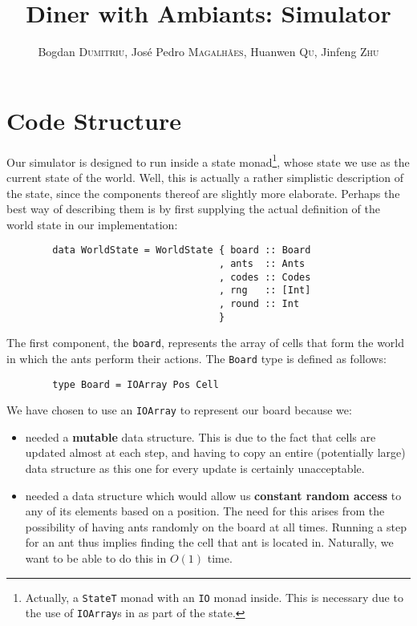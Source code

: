 \documentclass[a4paper,10pt]{article}
\title{Diner with Ambiants: Simulator}
\author{Bogdan \textsc{Dumitriu}, Jos\'e Pedro \textsc{Magalh\~aes}, Huanwen \textsc{Qu}, Jinfeng \textsc{Zhu}}
\begin{document}
\maketitle

\section{Code Structure}

Our simulator is designed to run inside a state monad\footnote[1]{Actually, a
{\tt StateT} monad with an {\tt IO} monad inside. This is necessary due to the
use of {\tt IOArray}s in as part of the state.}, whose state we use
as the current state of the world. Well, this is actually a rather simplistic
description of the state, since the components thereof are slightly more elaborate.
Perhaps the best way of describing them is by first supplying the actual definition
of the world state in our implementation:

\begin{verbatim}
        data WorldState = WorldState { board :: Board
                                     , ants  :: Ants
                                     , codes :: Codes
                                     , rng   :: [Int]
                                     , round :: Int
                                     }
\end{verbatim}

The first component, the {\tt board}, represents the array of cells that form the
world in which the ants perform their actions. The {\tt Board} type is defined
as follows:

\begin{verbatim}
        type Board = IOArray Pos Cell
\end{verbatim}

We have chosen to use an {\tt IOArray} to represent our board because we:

\begin{itemize}

\item needed a {\bf mutable} data structure. This is due to the fact that cells
are updated almost at each step, and having to copy an entire (potentially large)
data structure as this one for every update is certainly unacceptable.

\item needed a data structure which would allow us {\bf constant random access}
to any of its elements based on a position. The need for this arises from the
possibility of having ants randomly on the board at all times. Running a step for
an ant thus implies finding the cell that ant is located in. Naturally, we want to be
able to do this in $O(1)$ time.

\end{itemize}
\end{document}
